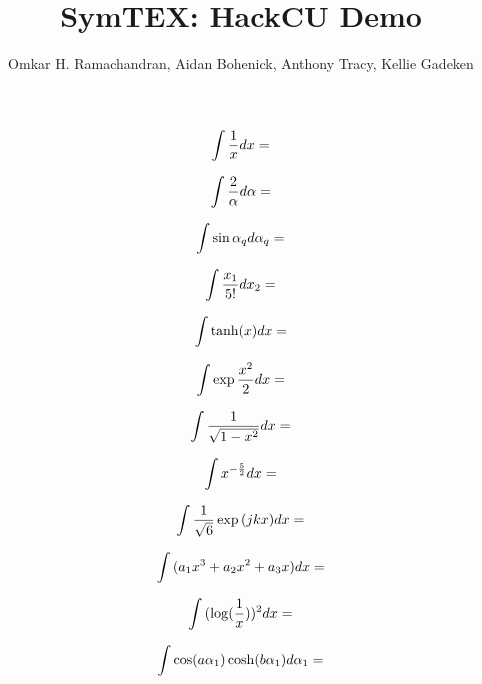 \documentclass[english]{article}
\newcommand{\eval}[1]{\immediate\write18{python3 symtex.py '#1' > intermediate.txt}}
\begin{document}
\title{SymTEX: HackCU Demo}

\author{Omkar H. Ramachandran, Aidan Bohenick, Anthony Tracy, Kellie Gadeken}
\maketitle

$$ \intop{\frac{1}{x} dx} = \eval{\intop{frac{1}{x} dx}} $$

$$ \intop{\frac{2}{\alpha} d\alpha} = \eval{\intop{frac{2}{alpha} dalpha}} $$

$$ \intop{\sin{\alpha_q} d\alpha_q} = \eval{\intop{sin{alpha_q} dalpha_q}} $$

$$ \intop{\frac{x_1}{5!} dx_2} = \eval{\intop{frac{x_1}{5!} dx_2}} $$

$$ \intop{\tanh(x) dx} = \eval{\intop{tanh(x) dx}} $$

$$ \intop{\exp{\frac{x^2}{2}} dx} = \eval{\intop{exp{frac{x^2}{2}} dx}} $$

$$ \intop{\frac{1}{\sqrt{1 - x^2}} dx} = \eval{\intop{frac{1}{sqrt{1 - x^2}} dx}} $$

$$ \intop{x^{-\frac{5}{2}} dx} = \eval{\intop{x^{-frac{5}{2}} dx}} $$

$$ \intop{\frac{1}{\sqrt{6}} \exp{(j k x)} dx} = \eval{\intop{frac{1}{sqrt{6}} exp{(j k x)} dx}}$$

$$ \intop{(a_1 x^3 + a_2 x^2 + a_3 x ) dx} = \eval{\intop{a_1 x^3 + a_2 x^2 + a_3 x dx}}$$

$$ \intop{(\log(\frac{1}{x}))^2 dx} = \eval{\intop{(log(frac{1}{x}))^2 dx}} $$

$$ \intop{\cos(a \alpha_1) \cosh(b \alpha_1) d\alpha_1} = \eval{\intop{cos(a alpha_1) cosh(b alpha_1) dalpha_1}} $$
\end{document}
